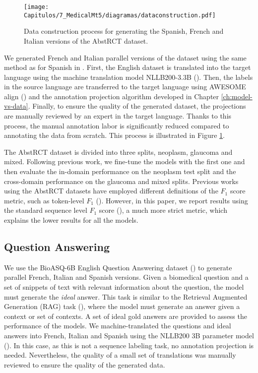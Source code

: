 \begin{figure}[htbp]
  \centering
  \texttt{[image: Capitulos/7\_MedicalMt5/diagramas/dataconstruction.pdf]}
  \caption{Data construction process for generating the Spanish, French and Italian versions of the AbstRCT dataset.}
  \label{fig7:dataconstruction}
\end{figure}


We generated French and Italian parallel versions of the dataset using the same method as for Spanish in \cite{yegingbergenova-cross}. First, the English dataset is translated into the target language using the machine translation model NLLB200-3.3B (\cite{DBLP:journals/corr/abs-2207-04672}). Then, the labels in the source language are transferred to the target language using AWESOME align (\cite{dou-neubig-2021-word}) and the annotation projection algorithm developed in Chapter \ref{ch:model-vs-data}. Finally, to ensure the quality of the generated dataset, the projections are manually reviewed by an expert in the target language. Thanks to this process, the manual annotation labor is significantly reduced compared to annotating the data from scratch. This process is illustrated in Figure \ref{fig7:dataconstruction}.

The AbstRCT dataset is divided into three splits, neoplasm, glaucoma and mixed. Following previous work, we fine-tune the models with the first one and then evaluate the in-domain performance on the neoplasm test split and the cross-domain performance on the glaucoma and mixed splits. Previous works using the AbstRCT datasets have employed different definitions of the $F_1$ score metric, such as token-level $F_1$ (\cite{mayer2021enhancing,yegingbergenova-cross}). However, in this paper, we report results using the standard sequence level $F_1$ score (\cite{DBLP:conf/conll/SangM03}), a much more strict metric, which explains the lower results for all the models.

\subsection{Question Answering}\label{sec:QA_explained}

We use the BioASQ-6B English Question Answering dataset (\cite{bioasq}) to generate parallel French, Italian and Spanish versions. Given a biomedical question and a set of snippets of text with relevant information about the question, the model must generate the \textit{ideal} answer. This task is similar to the Retrieval Augmented Generation (RAG) task (\cite{NEURIPS2020_6b493230}), where the model must generate an answer given a context or set of contexts. A set of ideal gold answers are provided to assess the performance of the models. We machine-translated the questions and ideal answers into French, Italian and Spanish using the NLLB200 3B parameter model (\cite{DBLP:journals/corr/abs-2207-04672}). In this case, as this is not a sequence labeling task, no annotation projection is needed. Nevertheless, the quality of a small set of translations was manually reviewed to ensure the quality of the generated data. 

